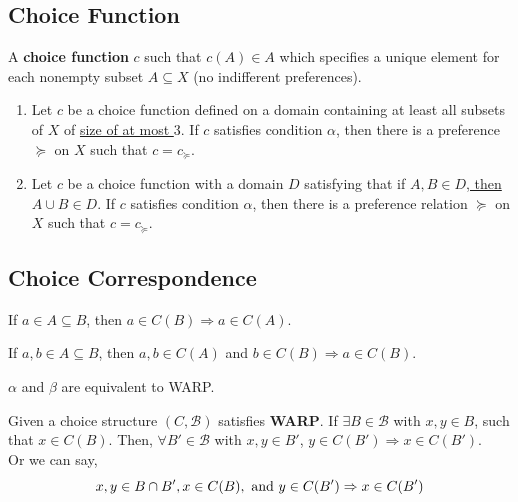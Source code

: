 \documentclass[11pt]{elegantbook}
\begin{document}
\subsection{Choice Function}
\begin{definition}
    \normalfont
    A \textbf{choice function} $c$ such that $c(A)\in A$ which specifies a unique element for each nonempty subset $A\subseteq X$ (no indifferent preferences).
\end{definition}
\begin{proposition}
    \begin{enumerate}[(1).]
        \item  Let $c$ be a choice function defined on a domain containing at least all subsets of $X$ of \underline{size of at most $3$}. If $c$ satisfies condition $\alpha$, then there is a preference $\succeq$ on $X$ such that $c=c_\succeq$.
        \item Let $c$ be a choice function with a domain $D$ satisfying that if \underline{$A, B \in D$, then $A \cup B \in D$}. If $c$ satisfies condition $\alpha$, then there is a preference relation $\succeq$ on $X$ such that $c = c_\succeq$.
    \end{enumerate}
\end{proposition}

\subsection{Choice Correspondence}
\begin{definition}
    \normalfont
    If $a\in A\subseteq B$, then $a\in C(B) \Rightarrow a\in C(A)$.
\end{definition}

\begin{definition}
    \normalfont
    If $a,b\in A\subseteq B$, then $a,b\in C(A)$ and $b\in C(B) \Rightarrow a\in C(B)$.
\end{definition}
$\alpha$ and $\beta$ are equivalent to WARP.
\begin{definition}\label{WARP}
    \normalfont
    Given a choice structure $(C,\mathcal{B})$ satisfies \textbf{WARP}. If $\exists B\in \mathcal{B}$ with $x,y\in B$, such that $x\in C(B)$. Then, $\forall B'\in \mathcal{B}$ with $x,y\in B'$, $y\in C(B') \Rightarrow x\in C(B')$.\\
    Or we can say, $$x,y\in B\cap B', x\in C(B), \textnormal{ and }y\in C(B') \Rightarrow x\in C(B')$$
\end{definition}
\end{document}
